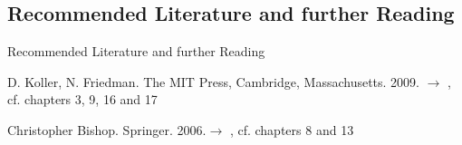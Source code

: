 \subsection{Recommended Literature and further Reading}

\begin{frame}[allowframebreaks]{Recommended Literature and further Reading}{}
	\footnotesize
	\begin{thebibliography}{2}		
			{D. Koller, N. Friedman. The MIT Press, Cambridge, Massachusetts. 2009.}
			{$\rightarrow$ \href{
				https://github.com/Zhenye-Na/machine-learning-uiuc/blob/master/docs/Probabilistic\%20Graphical\%20Models\%20-\%20Principles\%20and\%20Techniques.pdf
			}{}, cf. chapters 3, 9, 16 and 17}
			
			{Christopher Bishop. Springer. 2006.}{$\rightarrow$ \href{
				http://users.isr.ist.utl.pt/~wurmd/Livros/school/Bishop\%20-\%20Pattern\%20Recognition\%20And\%20Machine\%20Learning\%20-\%20Springer\%20\%202006.pdf
			}{}, cf. chapters 8 and 13}
	\end{thebibliography}
\end{frame}


\makethanks

